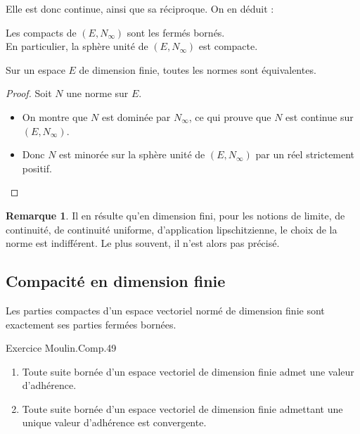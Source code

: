 \documentclass[french]{article}
\theoremstyle{plain}
\theoremstyle{definition}
\newtheorem*{rmq}{Remarque}
\theoremstyle{remark}
\begin{document}
Elle est donc continue, ainsi que sa réciproque. On en déduit :

\begin{lem}%
	Les compacts de $(E,N_\infty)$ sont les fermés bornés. \\
	En particulier, la sphère unité de $(E,N_\infty)$ est compacte.
\end{lem}

\begin{thm}%
	Sur un espace $E$ de dimension finie, toutes les normes sont équivalentes.
\end{thm}

\begin{proof}
	Soit $N$ une norme sur $E$.
	\begin{itemize}
		\item On montre que $N$ est dominée par $N_\infty$, ce qui prouve que $N$ est continue sur $(E,N_\infty)$.
		\item Donc $N$ est minorée sur la sphère unité de $(E,N_\infty)$ par un réel strictement positif.
	\end{itemize}
\end{proof}

\begin{rmq}
	Il en résulte qu'en dimension fini, pour les notions de limite, de continuité, de continuité uniforme, d'application lipschitzienne, le choix de la norme est indifférent. Le plus souvent, il n'est alors pas précisé.
\end{rmq}

\subsection{Compacité en dimension finie}

\begin{thm}%
	Les parties compactes d'un espace vectoriel normé de dimension finie sont exactement ses parties fermées bornées.
\end{thm}

Exercice Moulin.Comp.49

\begin{cor}%
	\begin{enumerate}
		\item Toute suite bornée d'un espace vectoriel de dimension finie admet une valeur d'adhérence.
		\item Toute suite bornée d'un espace vectoriel de dimension finie admettant une unique valeur d'adhérence est convergente.
	\end{enumerate}
\end{cor}
\end{document}
